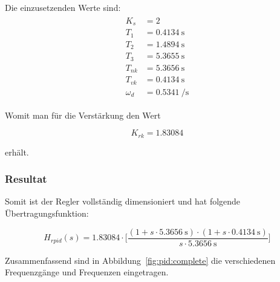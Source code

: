Die einzusetzenden Werte sind:
\begin{gather} \label{eq:pid:h_o_k_rk_one}
    \begin{split}
        K_s         & = 2                        \\
        T_1         & = \SI{0.4134}{\second}     \\
        T_2         & = \SI{1.4894}{\second}     \\
        T_3         & = \SI{5.3655}{\second}     \\
        T_{nk}      & = \SI{5.3656}{\second}     \\
        T_{vk}      & = \SI{0.4134}{\second}     \\
        \omega_d    & = \SI{0.5341}{\per\second}
    \end{split}
\end{gather}

Womit man f\"ur die Verst\"arkung den Wert

\begin{equation} \label{eq:pid:k_rk_result}
    K_{rk} = 1.83084
\end{equation}

erh\"alt.


\subsubsection{Resultat}

Somit   ist  der   Regler   vollst\"andig  dimensioniert   und  hat   folgende
\"Ubertragungsfunktion:

\begin{equation} \label{eq:pid:result}
    H_{rpid}(s) = 1.83084 \cdot \biggl[ \frac{(1 + s \cdot \SI{5.3656}{\second} ) \cdot (1 + s \cdot \SI{0.4134}{\second} ) }{ s \cdot \SI{5.3656}{\second} } \biggr]
\end{equation}

Zusammenfassend sind in Abbildung~\ref{fig:pid:complete} die verschiedenen
Frequenzg\"ange und Frequenzen eingetragen.

